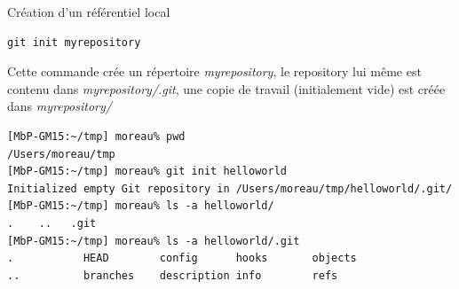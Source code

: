 




\begin{frame}[fragile]{%
\protect\hypertarget{cruxe9ation-dun-ruxe9fuxe9rentiel-local}{%
Création d’un référentiel local}}

\begin{verbatim}
git init myrepository
\end{verbatim}

Cette commande crée un répertoire \emph{myrepository}, le repository
lui même est contenu dans \emph{myrepository/.git},  une copie de
travail (initialement vide) est créée dans \emph{myrepository/}

\begin{lstlisting}
[MbP-GM15:~/tmp] moreau% pwd
/Users/moreau/tmp
[MbP-GM15:~/tmp] moreau% git init helloworld
Initialized empty Git repository in /Users/moreau/tmp/helloworld/.git/
[MbP-GM15:~/tmp] moreau% ls -a helloworld/
.    ..   .git
[MbP-GM15:~/tmp] moreau% ls -a helloworld/.git
.           HEAD        config      hooks       objects
..          branches    description info        refs
\end{lstlisting}

\end{frame}

